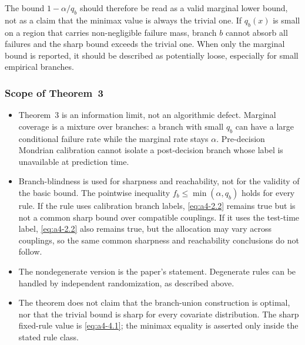 The bound $1-\alpha/q_b$ should therefore be read as a valid marginal
lower bound, not as a claim that the minimax value is always the trivial
one.  If $q_b(x)$ is small on a region that carries non-negligible
failure mass, branch $b$ cannot absorb all failures and the sharp bound
exceeds the trivial one.  When only the marginal bound is reported, it
should be described as potentially loose, especially for small empirical
branches.

\subsubsection{Scope of Theorem~3}

\begin{itemize}
\item Theorem~3 is an information limit, not an algorithmic defect.
Marginal coverage is a mixture over branches: a branch with small $q_b$
can have a large conditional failure rate while the marginal rate stays
$\alpha$.  Pre-decision Mondrian calibration cannot isolate a
post-decision branch whose label is unavailable at prediction time.
\item Branch-blindness is used for sharpness and reachability, not for
the validity of the basic bound.  The pointwise inequality
$f_b\le\min(\alpha,q_b)$ holds for every rule.  If the rule uses
calibration branch labels, \eqref{eq:a4-2.2} remains true but is not a
common sharp bound over compatible couplings.  If it uses the test-time
label, \eqref{eq:a4-2.2} also remains true, but the allocation may vary
across couplings, so the same common sharpness and reachability
conclusions do not follow.
\item The nondegenerate version is the paper's statement.  Degenerate
rules can be handled by independent randomization, as described above.
\item The theorem does not claim that the branch-union construction is
optimal, nor that the trivial bound is sharp for every covariate
distribution.  The sharp fixed-rule value is \eqref{eq:a4-4.1}; the
minimax equality is asserted only inside the stated rule class.
\end{itemize}

\let\theHequation\aIVtheHequation

